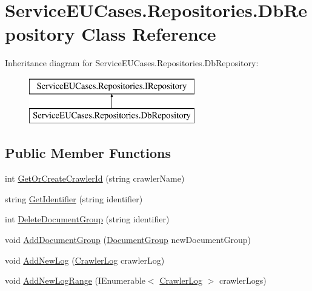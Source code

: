 \hypertarget{class_service_e_u_cases_1_1_repositories_1_1_db_repository}{\section{Service\-E\-U\-Cases.\-Repositories.\-Db\-Repository Class Reference}
\label{class_service_e_u_cases_1_1_repositories_1_1_db_repository}
}
Inheritance diagram for Service\-E\-U\-Cases.\-Repositories.\-Db\-Repository\-:\begin{figure}[H]
\begin{center}
\leavevmode
\includegraphics[height=2.000000cm]{class_service_e_u_cases_1_1_repositories_1_1_db_repository}
\end{center}
\end{figure}
\subsection*{Public Member Functions}
\begin{DoxyCompactItemize}
\item 
int \hyperlink{class_service_e_u_cases_1_1_repositories_1_1_db_repository_a381ff6dd92f7b5d581adbfd266b5d0b3}{Get\-Or\-Create\-Crawler\-Id} (string crawler\-Name)
\item 
string \hyperlink{class_service_e_u_cases_1_1_repositories_1_1_db_repository_adcd061aba1f49458147a626059a0ab96}{Get\-Identifier} (string identifier)
\item 
int \hyperlink{class_service_e_u_cases_1_1_repositories_1_1_db_repository_a09a87b14d6f32e2b1754890a3e6ec925}{Delete\-Document\-Group} (string identifier)
\item 
void \hyperlink{class_service_e_u_cases_1_1_repositories_1_1_db_repository_ae4b034e9103223b0b8bb78383032d466}{Add\-Document\-Group} (\hyperlink{class_service_e_u_cases_1_1_data_1_1_document_group}{Document\-Group} new\-Document\-Group)
\item 
void \hyperlink{class_service_e_u_cases_1_1_repositories_1_1_db_repository_a99421faf8de77dc789effe40a7b93113}{Add\-New\-Log} (\hyperlink{class_service_e_u_cases_1_1_data_1_1_crawler_log}{Crawler\-Log} crawler\-Log)
\item 
void \hyperlink{class_service_e_u_cases_1_1_repositories_1_1_db_repository_a9af7cfcd5421e7ffb403430487138ae5}{Add\-New\-Log\-Range} (I\-Enumerable$<$ \hyperlink{class_service_e_u_cases_1_1_data_1_1_crawler_log}{Crawler\-Log} $>$ crawler\-Logs)
\end{DoxyCompactItemize}



